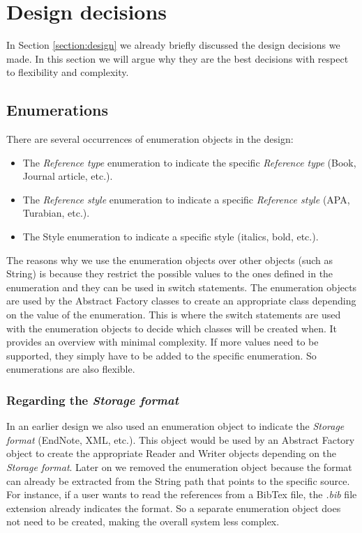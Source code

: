 \documentclass[a4paper]{article}
\begin{document}
\section{Design decisions}
In Section \ref{section:design} we already briefly discussed the design decisions we made. In this section we will argue why they are the best decisions with respect to flexibility and complexity.

\subsection{Enumerations}
There are several occurrences of enumeration objects in the design:

\begin{itemize}
	\item The \textit{Reference type} enumeration to indicate the specific \textit{Reference type} (Book, Journal article, etc.).
	\item The \textit{Reference style} enumeration to indicate a specific \textit{Reference style} (APA, Turabian, etc.).
	\item The Style enumeration to indicate a specific style (italics, bold, etc.).
\end{itemize}

The reasons why we use the enumeration objects over other objects (such as String) is because they restrict the possible values to the ones defined in the enumeration and they can be used in switch statements. The enumeration objects are used by the Abstract Factory classes to create an appropriate class depending on the value of the enumeration. This is where the switch statements are used with the enumeration objects to decide which classes will be created when. It provides an overview with minimal complexity. If more values need to be supported, they simply have to be added to the specific enumeration. So enumerations are also flexible.

\subsubsection{Regarding the \textit{Storage format}}
In an earlier design we also used an enumeration object to indicate the \textit{Storage format} (EndNote, XML, etc.). This object would be used by an Abstract Factory object to create the appropriate Reader and Writer objects depending on the \textit{Storage format}. Later on we removed the enumeration object because the format can already be extracted from the String path that points to the specific source. For instance, if a user wants to read the references from a BibTex file, the \textit{.bib} file extension already indicates the format. So a separate enumeration object does not need to be created, making the overall system less complex.
\end{document}

